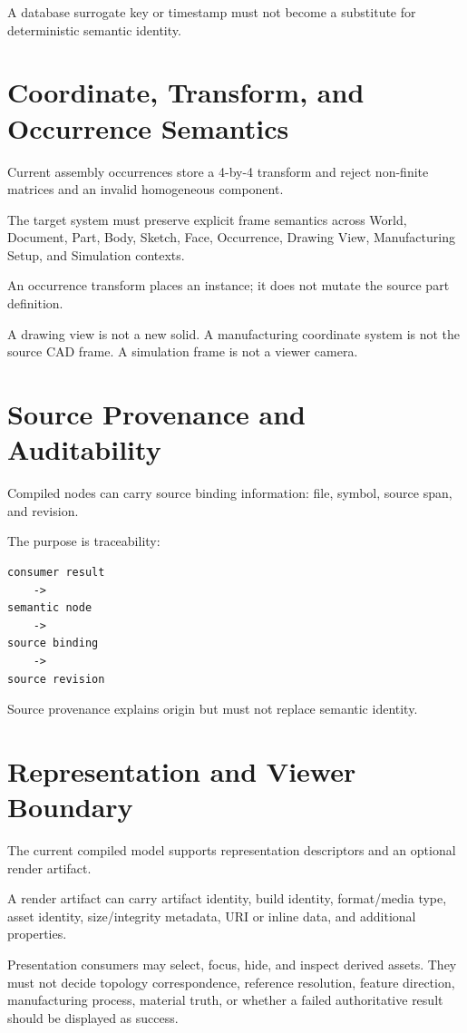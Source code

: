 \documentclass[11pt,a4paper]{report}
\begin{document}
A database surrogate key or timestamp must not become a substitute for deterministic semantic identity.

\chapter{Coordinate, Transform, and Occurrence Semantics}

Current assembly occurrences store a 4-by-4 transform and reject non-finite matrices and an invalid homogeneous component.

The target system must preserve explicit frame semantics across World, Document, Part, Body, Sketch, Face, Occurrence, Drawing View, Manufacturing Setup, and Simulation contexts.

An occurrence transform places an instance; it does not mutate the source part definition.

A drawing view is not a new solid. A manufacturing coordinate system is not the source CAD frame. A simulation frame is not a viewer camera.

\chapter{Source Provenance and Auditability}

Compiled nodes can carry source binding information: file, symbol, source span, and revision.

The purpose is traceability:

\begin{lstlisting}
consumer result
    ->
semantic node
    ->
source binding
    ->
source revision
\end{lstlisting}

Source provenance explains origin but must not replace semantic identity.

\chapter{Representation and Viewer Boundary}

The current compiled model supports representation descriptors and an optional render artifact.

A render artifact can carry artifact identity, build identity, format/media type, asset identity, size/integrity metadata, URI or inline data, and additional properties.

Presentation consumers may select, focus, hide, and inspect derived assets. They must not decide topology correspondence, reference resolution, feature direction, manufacturing process, material truth, or whether a failed authoritative result should be displayed as success.
\end{document}
